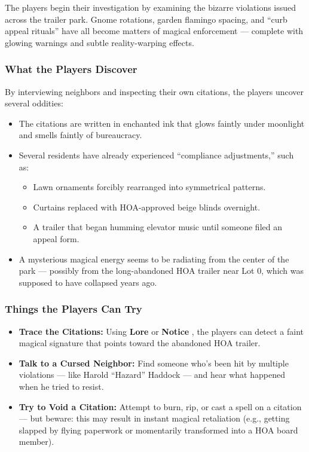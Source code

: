 The players begin their investigation by examining the bizarre violations issued across the trailer park. Gnome rotations, garden flamingo spacing, and “curb appeal rituals” have all become matters of magical enforcement — complete with glowing warnings and subtle reality-warping effects.

\subsubsection*{What the Players Discover}
By interviewing neighbors and inspecting their own citations, the players uncover several oddities:

\begin{itemize}
    \item The citations are written in enchanted ink that glows faintly under moonlight and smells faintly of bureaucracy.
    \item Several residents have already experienced “compliance adjustments,” such as:
    \begin{itemize}
        \item Lawn ornaments forcibly rearranged into symmetrical patterns.
        \item Curtains replaced with HOA-approved beige blinds overnight.
        \item A trailer that began humming elevator music until someone filed an appeal form.
    \end{itemize}
    \item A mysterious magical energy seems to be radiating from the center of the park — possibly from the long-abandoned HOA trailer near Lot 0, which was supposed to have collapsed years ago.
\end{itemize}

\subsubsection*{Things the Players Can Try}
\begin{itemize}
    \item \textbf{Trace the Citations:} Using \textbf{Lore} or \textbf{Notice} , the players can detect a faint magical signature that points toward the abandoned HOA trailer.
    \item \textbf{Talk to a Cursed Neighbor:} Find someone who’s been hit by multiple violations — like Harold “Hazard” Haddock — and hear what happened when he tried to resist.
    \item \textbf{Try to Void a Citation:} Attempt to burn, rip, or cast a spell on a citation — but beware: this may result in instant magical retaliation (e.g., getting slapped by flying paperwork or momentarily transformed into a HOA board member).
\end{itemize}

